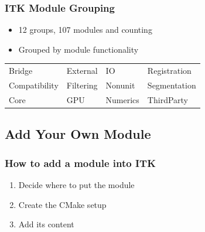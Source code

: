 \begin{frame}
\frametitle{ITK Module Grouping}
\begin{itemize}
\item  12 groups, 107 modules and counting
\pause
\item  Grouped by module functionality
\pause
\end{itemize}
\vskip14pt
\begin{tabular}{llll}
Bridge     &    \alert{External}   & IO        & Registration \\
Compatibility  & Filtering  & Nonunit   & Segmentation \\
Core           & GPU        & Numerics  & ThirdParty \\
\end{tabular}
\end{frame}

\subsection{Add Your Own Module}

\begin{frame}
\frametitle{How to add a module into ITK}
\begin{enumerate}
\item Decide where to put the module
\pause
\item Create the CMake setup
\pause
\item Add its content
\end{enumerate}
\end{frame}


